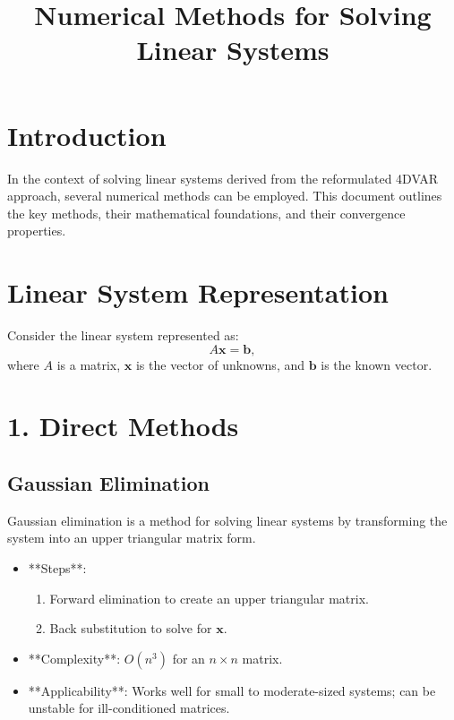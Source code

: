 \documentclass{article}
\title{Numerical Methods for Solving Linear Systems}
\author{}
\date{}
\begin{document}
\maketitle

\section{Introduction}
In the context of solving linear systems derived from the reformulated 4DVAR approach, several numerical methods can be employed. This document outlines the key methods, their mathematical foundations, and their convergence properties.

\section{Linear System Representation}
Consider the linear system represented as:
\begin{equation}
A \mathbf{x} = \mathbf{b},
\end{equation}
where \( A \) is a matrix, \( \mathbf{x} \) is the vector of unknowns, and \( \mathbf{b} \) is the known vector.

\section{1. Direct Methods}

\subsection{Gaussian Elimination}
Gaussian elimination is a method for solving linear systems by transforming the system into an upper triangular matrix form.

\begin{itemize}
    \item **Steps**: 
    \begin{enumerate}
        \item Forward elimination to create an upper triangular matrix.
        \item Back substitution to solve for \( \mathbf{x} \).
    \end{enumerate}
    \item **Complexity**: \( O(n^3) \) for an \( n \times n \) matrix.
    \item **Applicability**: Works well for small to moderate-sized systems; can be unstable for ill-conditioned matrices.
\end{itemize}
\end{document}

